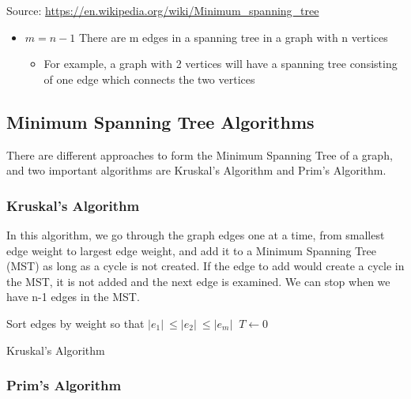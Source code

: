\documentclass[english, 10pt]{article}
\begin{document}
Source: \url{https://en.wikipedia.org/wiki/Minimum_spanning_tree}



\begin{itemize}
   \item  $m = n - 1$ There are m edges in a spanning tree in a graph with n vertices \begin{itemize}
     \item  For example, a graph with 2 vertices will have a spanning tree consisting of one edge which connects the two vertices
   \end{itemize}
 \end{itemize}

\subsection{Minimum Spanning Tree Algorithms}

There are different approaches to form the Minimum Spanning Tree of a graph, and two important algorithms are Kruskal's Algorithm and Prim's Algorithm.

\subsubsection{Kruskal's Algorithm}

In this algorithm, we go through the graph edges one at a time, from smallest edge weight to largest edge weight, and add it to a Minimum Spanning Tree (MST) as long as a cycle is not created. If the edge to add would create a cycle in the MST, it is not added and the next edge is examined. We can stop when we have n-1 edges in the MST. 

\begin{algorithm}
    Sort edges by weight so that $\lvert e_1\rvert\ \leq \lvert e_2\rvert\ \leq \lvert e_m\rvert\ $\;
    {}
    $T \gets 0$\;
    {}
    \caption{Kruskal's Algorithm}
\end{algorithm}

\subsubsection{Prim's Algorithm}
\end{document}

